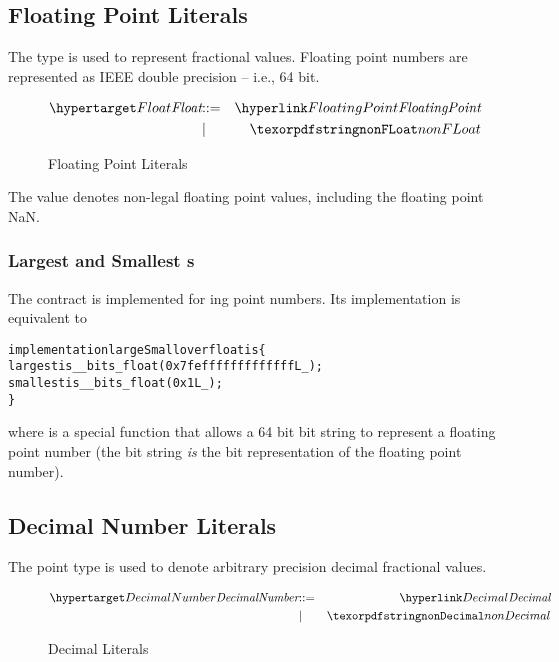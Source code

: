 \subsection{Floating Point Literals}
\label{floatType}

The  type is used to represent fractional values. Floating point numbers are represented as IEEE double precision -- i.e., 64 bit.

\begin{figure}[H]
\begin{eqnarray*}
\ntDef{Float}&\arrow&\ntRef{FloatingPoint}\\
&\choice&\q{nonFLoat}
\end{eqnarray*}
\caption{Floating Point Literals}
\label{floatExpressionFig}
\end{figure}

The  value denotes non-legal floating point values, including the floating point NaN.

\subsubsection{Largest and Smallest s}
The  contract is implemented for ing point numbers. Its implementation is equivalent to
\begin{alltt}
implementation largeSmall over float is \{
  largest is __bits_float(0x7fefffffffffffffL_);
  smallest is __bits_float(0x1L_);
\}
\end{alltt}

where  is a special function that allows a 64 bit bit string to represent a floating point number (the bit string \emph{is} the bit representation of the floating point number).

\subsection{Decimal Number Literals}
\label{decimalype}

The  point type is used to denote arbitrary precision decimal fractional values. 

\begin{figure}[htbp]
\begin{eqnarray*}
\ntDef{DecimalNumber}&\arrow&\ntRef{Decimal}\\
&\choice&\q{nonDecimal}
\end{eqnarray*}
\caption{Decimal Literals}
\label{decimalExpressionFig}
\end{figure}

